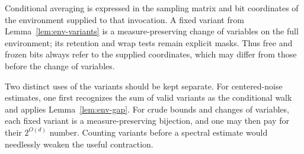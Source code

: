 \begin{remark}
\label{rem:env-effective}
Conditional averaging is expressed in the sampling matrix and bit coordinates
of the environment supplied to that invocation. A fixed variant from
Lemma~\ref{lem:env-variants} is a measure-preserving change of variables
on the full environment; its retention and wrap tests remain explicit masks.
Thus free and frozen bits always refer to the supplied coordinates,
which may differ from those before the change of variables.
\end{remark}

\begin{remark}\label{rem:env-averaging}
Two distinct uses of the variants should be kept separate.
For centered-noise estimates, one first recognizes the sum of valid
variants as the conditional walk and applies
Lemma~\ref{lem:env-gap}. For crude bounds and changes of variables,
each fixed variant is a measure-preserving bijection, and one may
then pay for their $2^{O(d)}$ number. Counting variants before a
spectral estimate would needlessly weaken the useful contraction.
\end{remark}
